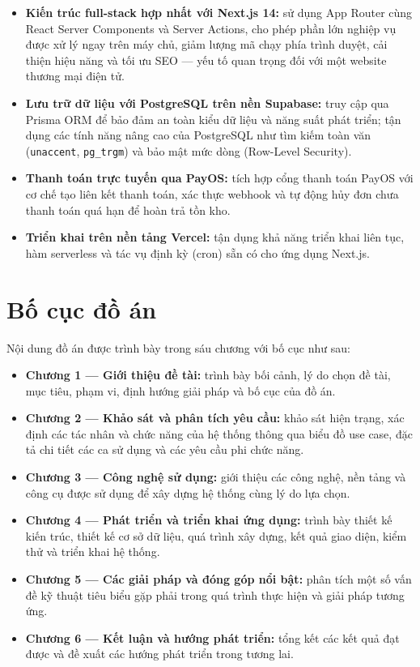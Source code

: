 \begin{itemize}
  \item \textbf{Kiến trúc full-stack hợp nhất với Next.js 14:} sử dụng App Router cùng React
  Server Components và Server Actions, cho phép phần lớn nghiệp vụ được xử lý ngay trên máy chủ,
  giảm lượng mã chạy phía trình duyệt, cải thiện hiệu năng và tối ưu SEO --- yếu tố quan trọng đối
  với một website thương mại điện tử.

  \item \textbf{Lưu trữ dữ liệu với PostgreSQL trên nền Supabase:} truy cập qua Prisma ORM để
  bảo đảm an toàn kiểu dữ liệu và năng suất phát triển; tận dụng các tính năng nâng cao của
  PostgreSQL như tìm kiếm toàn văn (\texttt{unaccent}, \texttt{pg\_trgm}) và bảo mật mức dòng
  (Row-Level Security).

  \item \textbf{Thanh toán trực tuyến qua PayOS:} tích hợp cổng thanh toán PayOS với cơ chế tạo
  liên kết thanh toán, xác thực webhook và tự động hủy đơn chưa thanh toán quá hạn để hoàn trả
  tồn kho.

  \item \textbf{Triển khai trên nền tảng Vercel:} tận dụng khả năng triển khai liên tục, hàm
  serverless và tác vụ định kỳ (cron) sẵn có cho ứng dụng Next.js.
\end{itemize}

\section{Bố cục đồ án}

Nội dung đồ án được trình bày trong sáu chương với bố cục như sau:

\begin{itemize}
  \item \textbf{Chương 1 --- Giới thiệu đề tài:} trình bày bối cảnh, lý do chọn đề tài, mục tiêu,
  phạm vi, định hướng giải pháp và bố cục của đồ án.
  \item \textbf{Chương 2 --- Khảo sát và phân tích yêu cầu:} khảo sát hiện trạng, xác định các tác
  nhân và chức năng của hệ thống thông qua biểu đồ use case, đặc tả chi tiết các ca sử dụng và các
  yêu cầu phi chức năng.
  \item \textbf{Chương 3 --- Công nghệ sử dụng:} giới thiệu các công nghệ, nền tảng và công cụ
  được sử dụng để xây dựng hệ thống cùng lý do lựa chọn.
  \item \textbf{Chương 4 --- Phát triển và triển khai ứng dụng:} trình bày thiết kế kiến trúc, thiết
  kế cơ sở dữ liệu, quá trình xây dựng, kết quả giao diện, kiểm thử và triển khai hệ thống.
  \item \textbf{Chương 5 --- Các giải pháp và đóng góp nổi bật:} phân tích một số vấn đề kỹ thuật
  tiêu biểu gặp phải trong quá trình thực hiện và giải pháp tương ứng.
  \item \textbf{Chương 6 --- Kết luận và hướng phát triển:} tổng kết các kết quả đạt được và đề
  xuất các hướng phát triển trong tương lai.
\end{itemize}
